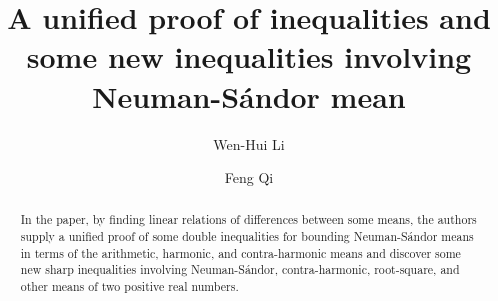 \documentclass[reqno,a4paper]{amsart}
\numberwithin{equation}{section}
\theoremstyle{plain}
\theoremstyle{remark}
\begin{document}
\title[Some inequalities for Neuman-S\'andor mean]
{A unified proof of inequalities and some new inequalities involving Neuman-S\'andor mean}

\author[W.-H. Li]{Wen-Hui Li}
\address[Li]{Department of Mathematics, School of Science,
Tianjin Polytechnic University, Tianjin City, 300387, China}

\author[F. Qi]{Feng Qi}
\address[Qi]{Department of Mathematics, School of Science,
 Tianjin Polytechnic University, Tianjin City, 300387, China}



\begin{abstract}
In the paper, by finding linear relations of differences between some means, the authors supply a unified proof of some double inequalities for bounding Neuman-S\'andor means in terms of the arithmetic, harmonic, and contra-harmonic means and discover some new sharp inequalities involving Neuman-S\'andor, contra-harmonic, root-square, and other means of two positive real numbers.
\end{abstract}

\maketitle
\end{document}
